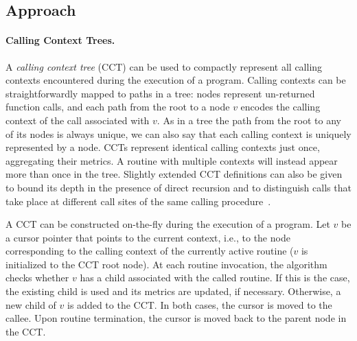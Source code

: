 

\subsection{Approach}

\paragraph*{Calling Context Trees.} A {\em calling context tree} (CCT) can be used to compactly represent all calling contexts encountered during the execution of a program. Calling contexts can be straightforwardly mapped to paths in a tree: nodes represent un-returned function calls, and each path from the root to a node $v$ encodes the calling context of the call associated with $v$. As in a tree the path from the root to any of its nodes is always unique, we can also say that each calling context is uniquely represented by a node. CCTs represent identical calling contexts just once, aggregating their metrics. A routine with multiple contexts will instead appear more than once in the tree. Slightly extended CCT definitions can also be given to bound its depth in the presence of direct recursion and to distinguish calls that take place at different call sites of the same calling procedure~\cite{Ammons97}.


A CCT can be constructed on-the-fly during the execution of a program. Let $v$ be a cursor pointer that points to the current context, i.e., to the node corresponding to the calling context of the currently active routine ($v$ is initialized to the CCT root node). At each routine invocation, the algorithm checks whether $v$ has a child associated with the called routine. If this is the case, the existing child is used and its metrics are updated, if necessary. Otherwise, a new child of $v$ is added to the CCT.  In both cases, the cursor is moved to the callee. Upon routine termination, the cursor is moved back to the parent node in the CCT. %

